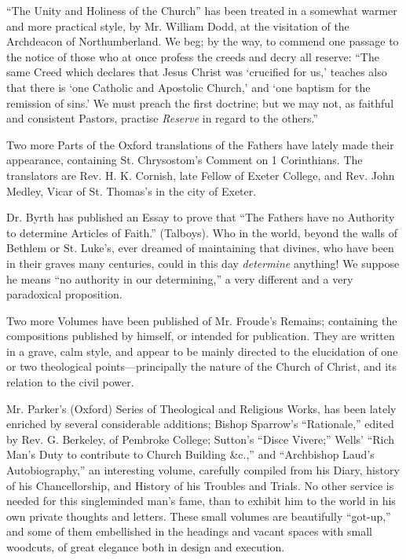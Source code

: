 ``The Unity and Holiness of the Church'' has been
treated in a somewhat warmer and more practical style, by Mr. William
Dodd, at the visitation of the Archdeacon of Northumberland. We beg; by
the way, to commend one passage to the notice of those who at once
profess the creeds and decry all reserve: ``The same Creed which declares
that Jesus Christ was ‘crucified for us,' teaches also that there is
‘one Catholic and Apostolic Church,' and ‘one baptism for the
remission of sins.' We must preach the first doctrine; but we may not,
as faithful and consistent Pastors, practise \emph{Reserve} in regard to
the others.''

Two more Parts of the Oxford translations of the
Fathers have lately made their appearance, containing St.
Chrysostom's Comment on 1 Corinthians. The translators are Rev. H. K.
Cornish, late Fellow of Exeter College, and Rev. John Medley, Vicar of
St. Thomas's in the city of Exeter.

Dr. Byrth has published an Essay to prove that ``The
Fathers have no Authority to determine Articles of Faith.'' (Talboys).
Who in the world, beyond the walls of Bethlem or St. Luke's, ever
dreamed of maintaining that divines, who have been in their graves many
centuries, could in this day \emph{determine} anything! We suppose he
means ``no authority in our determining,'' a very different and a very
paradoxical proposition.

Two more Volumes have been published of Mr. Froude's
Remains; containing the compositions published by himself, or intended
for publication. They are written in a grave, calm style, and appear to
be mainly directed to the elucidation of one or two theological
points—principally the nature of the Church of Christ, and its
relation to the civil power.

Mr. Parker's (Oxford) Series of Theological and
Religious Works, has been lately enriched by several considerable
additions; Bishop Sparrow's ``Rationale,'' edited by Rev. G. Berkeley, of
Pembroke College; Sutton's ``Disce Vivere;'' Wells' ``Rich Man's Duty to
contribute to Church Building \&c.,'' and ``Archbishop Laud's
Autobiography,'' an interesting volume, carefully compiled from his
Diary, history of his Chancellorship, and History of his Troubles and
Trials. No other service is needed for this singleminded man's fame,
than to exhibit him to the world in his own private thoughts and
letters. These small volumes are beautifully ``got-up,'' and some of them
embellished in the headings and vacant spaces with small woodcuts, of
great elegance both in design and execution.

